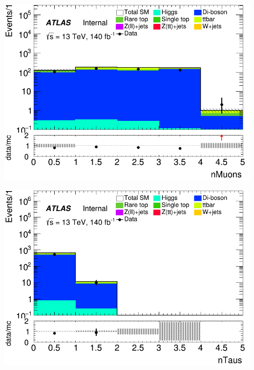 \documentclass[usenames,dvipsnames]{beamer}
\begin{document}
\begin{frame}
    \begin{minipage}{0.32\textwidth}
        \centering
        \includegraphics[width=\textwidth]{graphics/LLL_met/LLL_met_nMuons.png}
    \end{minipage}
    \hfill
    \begin{minipage}{0.32\textwidth}
        \centering
        \includegraphics[width=\textwidth]{graphics/LLL_met/LLL_met_nTaus.png}
    \end{minipage}
    \hfill
    \begin{minipage}{0.32\textwidth}
        \centering

\end{minipage}
\end{frame}
\end{document}
